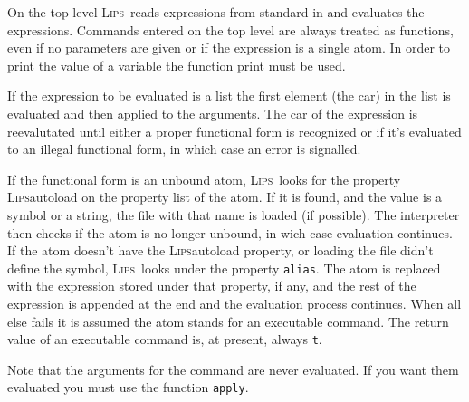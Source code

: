 \documentclass[a4paper]{article}
\newcommand{\lips}{\textsc{Lips}}
\newcommand{\lisp}[1]{\texttt{#1}}
\newcommand{\T}{\lisp{t}}
\begin{document}
On the top level \lips\ reads expressions from standard in and
evaluates the expressions.  Commands entered on the top level are
always treated as functions, even if no parameters are given or if the
expression is a single atom.  In order to print the value of a
variable the function print must be used.

If the expression to be evaluated is a list the first element (the
car) in the list is evaluated and then applied to the arguments.  The
car of the expression is reevalutated until either a proper functional
form is recognized or if it's evaluated to an illegal functional form,
in which case an error is signalled.

If the functional form is an unbound atom, \lips\ looks for the
property \lips{autoload} on the property list of the atom.  If it is
found, and the value is a symbol or a string, the file with that name
is loaded (if possible).  The interpreter then checks if the atom is
no longer unbound, in wich case evaluation continues.  If the atom
doesn't have the \lips{autoload} property, or loading the file didn't
define the symbol, \lips\ looks under the property \lisp{alias}.  The
atom is replaced with the expression stored under that property, if
any, and the rest of the expression is appended at the end and the
evaluation process continues.  When all else fails it is assumed the
atom stands for an executable command.  The return value of an
executable command is, at present, always \T.

Note that the arguments for the command are never evaluated.  If you
want them evaluated you must use the function \lisp{apply}.
\end{document}
